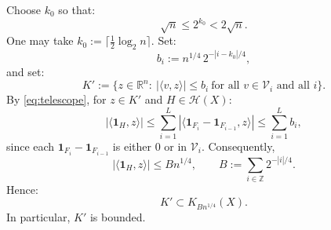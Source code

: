 \documentclass[12pt,reqno]{amsart}
\makeatletter
\def\le{\leqslant}
\def\le{\leqslant}
\theoremstyle{remark}
\renewenvironment{proof}[1][\proofname]{%
  \par\vspace{\topsep}%
  \normalfont\topsep6\p@\@plus6\p@\relax
  \trivlist
  \item[\hskip\labelsep\itshape #1\@addpunct{.}]\ignorespaces
}{%
  \endtrivlist
}
\numberwithin{equation}{section}
\newcommand{\one}{\mathbf{1}}
\def \R {\mathbb{R}}
\makeatother
\begin{document}
\begin{proof}
Choose \(k_0\) so that:
\[
\sqrt n\le2^{k_0}<2\sqrt n.
\]
One may take \(k_0:=\lceil\frac12\log_2n\rceil\). Set:
\[
b_i:=n^{1/4}\,2^{-|i-k_0|/4},
\]
and set:
\[
K':=\bigl\{z\in\R^n:\ |\langle v,z\rangle|\le b_i\ \text{for all }v\in\mathcal V_i\text{ and all }i\bigr\}.
\]
By \eqref{eq:telescope}, for \(z\in K'\) and \(H\in\mathcal H(X)\):
\[
|\langle\one_H,z\rangle| \le 
\sum_{i=1}^L
|\langle\one_{F_i}-\one_{F_{i-1}},z\rangle| \le\sum_{i=1}^Lb_i,
\]
since each \(\one_{F_i}-\one_{F_{i-1}}\) is either 0 or in \(\mathcal V_i\). Consequently,
\[
|\langle\one_H,z\rangle| \le Bn^{1/4},\qquad
B:=\sum_{i\in\mathbb Z}2^{-|i|/4}.
\]
Hence:
\begin{equation}\label{eq:chain-support}
K'\subset K_{Bn^{1/4}}(X).
\end{equation}
In particular, \(K'\) is bounded.
\smallskip%


\end{proof}
\end{document}

